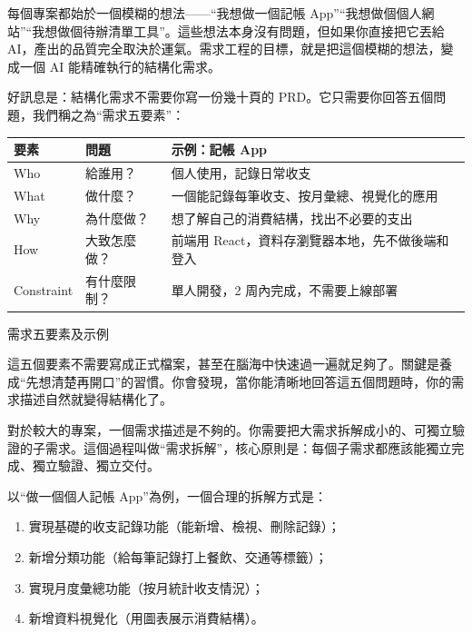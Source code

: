 


每個專案都始於一個模糊的想法——“我想做一個記帳 App”“我想做個個人網站”“我想做個待辦清單工具”。這些想法本身沒有問題，但如果你直接把它丟給 AI，產出的品質完全取決於運氣。需求工程的目標，就是把這個模糊的想法，變成一個 AI 能精確執行的結構化需求。

好訊息是：結構化需求不需要你寫一份幾十頁的 PRD。它只需要你回答五個問題，我們稱之為“需求五要素”：

\begin{center}
\begin{tabularx}{\linewidth}{|X|X|X|}
\hline
\textbf{要素} & \textbf{問題} & \textbf{示例：記帳 App} \tabularnewline
\hline
Who & 給誰用？ & 個人使用，記錄日常收支 \tabularnewline
What & 做什麼？ & 一個能記錄每筆收支、按月彙總、視覺化的應用 \tabularnewline
Why & 為什麼做？ & 想了解自己的消費結構，找出不必要的支出 \tabularnewline
How & 大致怎麼做？ & 前端用 React，資料存瀏覽器本地，先不做後端和登入 \tabularnewline
Constraint & 有什麼限制？ & 單人開發，2 周內完成，不需要上線部署 \tabularnewline
\hline
\end{tabularx}
\end{center}

\begin{center}\small\color{gray}需求五要素及示例\end{center}

這五個要素不需要寫成正式檔案，甚至在腦海中快速過一遍就足夠了。關鍵是養成“先想清楚再開口”的習慣。你會發現，當你能清晰地回答這五個問題時，你的需求描述自然就變得結構化了。


對於較大的專案，一個需求描述是不夠的。你需要把大需求拆解成小的、可獨立驗證的子需求。這個過程叫做“需求拆解”，核心原則是：每個子需求都應該能獨立完成、獨立驗證、獨立交付。

以“做一個個人記帳 App”為例，一個合理的拆解方式是：

\begin{enumerate}
  \item 實現基礎的收支記錄功能（能新增、檢視、刪除記錄）；
  \item 新增分類功能（給每筆記錄打上餐飲、交通等標籤）；
  \item 實現月度彙總功能（按月統計收支情況）；
  \item 新增資料視覺化（用圖表展示消費結構）。
\end{enumerate}

